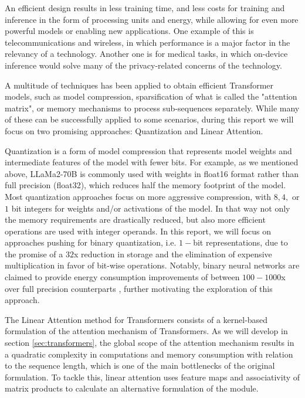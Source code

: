 An efficient design results in less training time, and less costs for training and inference in the form of processing units and energy, while allowing for even more powerful models or enabling new applications. One example of this is telecommunications and wireless, in which performance is a major factor in the relevancy of a technology. Another one is for medical tasks, in which on-device inference would solve many of the privacy-related concerns of the technology. 

A multitude of techniques has been applied to obtain efficient Transformer models, such as model compression, sparsification of what is called the "attention matrix", or memory mechanisms to process sub-sequences separately. While many of these can be successfully applied to some scenarios, during this report we will focus on two promising approaches: Quantization and Linear Attention.

Quantization is a form of model compression that represents model weights and intermediate features of the model with fewer bits. For example, as we mentioned above, LLaMa2-70B is commonly used with weights in float16 format rather than full precision (float32), which reduces half the memory footprint of the model. Most quantization approaches focus on more aggressive compression, with $8, 4,$ or $1$ bit integers for weights and/or activations of the model. In that way not only the memory requirements are drastically reduced, but also more efficient operations are used with integer operands. In this report, we will focus on approaches pushing for binary quantization, i.e. $1-$bit representations, due to the promise of a $32$x reduction in storage and the elimination of expensive multiplication in favor of bit-wise operations. Notably, binary neural networks are claimed to provide energy consumption improvements of between $100-1000$x over full precision counterparts \cite{energy7929192}, further motivating the exploration of this approach.

The Linear Attention method for Transformers consists of a kernel-based formulation of the attention mechanism of Transformers. As we will develop in section \ref{sec:transformers}, the global scope of the attention mechanism results in a quadratic complexity in computations and memory consumption with relation to the sequence length, which is one of the main bottlenecks of the original formulation. To tackle this, linear attention uses feature maps and associativity of matrix products to calculate an alternative formulation of the module.
